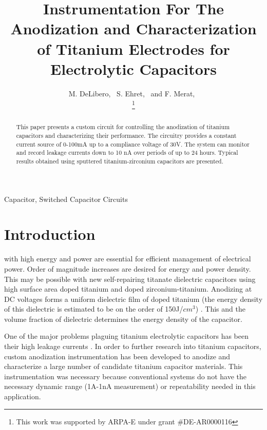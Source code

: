 \documentclass[journal]{IEEEtran}
\begin{document}
\title{Instrumentation For The Anodization and Characterization of Titanium Electrodes for Electrolytic Capacitors}

\author{M. DeLibero,~
        S. Ehret,~
        and F. Merat,~%

\thanks{This work was supported by ARPA-E under grant \#DE-AR0000116}}

\maketitle

\begin{abstract}
This paper presents a custom circuit for controlling the anodization of titanium capacitors and characterizing their performance. The circuitry provides a constant current source of 0-100mA up to a compliance voltage of 30V. The system can monitor and record leakage currents down to 10 nA over periods of up to 24 hours. Typical results obtained using sputtered titanium-zirconium capacitors are presented.
\end{abstract}

\begin{IEEEkeywords}
Capacitor, Switched Capacitor Circuits
\end{IEEEkeywords}

\IEEEpeerreviewmaketitle

\section{Introduction}

 with high energy and power are essential for efficient management of electrical power.  Order of magnitude increases are desired for energy and power density. This may be possible with new self-repairing titanate dielectric capacitors using high surface area doped titanium and doped zirconium-titanium.  Anodizing at DC voltages forms a uniform dielectric film of doped titanium (the energy density of this dielectric is estimated to be on the order of 150J/$cm^3$) \cite{tiSponge}. This and the volume fraction of dielectric determines the energy density of the capacitor.

One of the major problems plaguing titanium electrolytic capacitors has been their high leakage currents \cite{tiCharHag}. In order to further research into titanium capacitors, custom anodization instrumentation has been developed to anodize and characterize a large number of candidate titanium capacitor materials. This instrumentation was necessary because conventional systems do not have the necessary dynamic range (1A-1nA measurement) or repeatability needed in this application.
\end{document}
